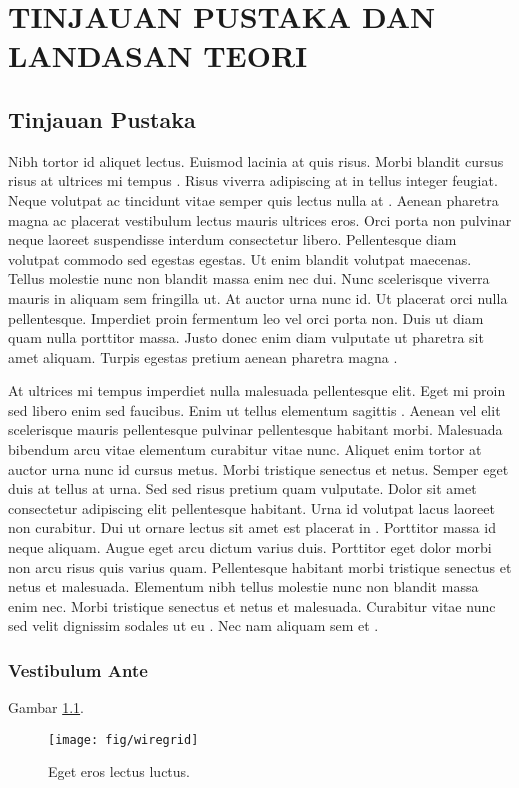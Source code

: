 \chapter{TINJAUAN PUSTAKA DAN LANDASAN TEORI}
\lipsum[90]
\section{Tinjauan Pustaka}
Nibh tortor id aliquet lectus. Euismod lacinia at quis risus. Morbi blandit cursus risus at ultrices mi tempus \cite{Mortazavi2015,Hasheminamin2015}. Risus viverra adipiscing at in tellus integer feugiat. Neque volutpat ac tincidunt vitae semper quis lectus nulla at \cite{Abdelkader2020}. Aenean pharetra magna ac placerat vestibulum lectus mauris ultrices eros. Orci porta non pulvinar neque laoreet suspendisse interdum consectetur libero. Pellentesque diam volutpat commodo sed egestas egestas. Ut enim blandit volutpat maecenas. Tellus molestie nunc non blandit massa enim nec dui. Nunc scelerisque viverra mauris in aliquam sem fringilla ut. At auctor urna nunc id. Ut placerat orci nulla pellentesque. Imperdiet proin fermentum leo vel orci porta non. Duis ut diam quam nulla porttitor massa. Justo donec enim diam vulputate ut pharetra sit amet aliquam. Turpis egestas pretium aenean pharetra magna \cite{Breker2015}.

At ultrices mi tempus imperdiet nulla malesuada pellentesque elit. Eget mi proin sed libero enim sed faucibus. Enim ut tellus elementum sagittis \cite{Beck2016}. Aenean vel elit scelerisque mauris pellentesque pulvinar pellentesque habitant morbi. Malesuada bibendum arcu vitae elementum curabitur vitae nunc. Aliquet enim tortor at auctor urna nunc id cursus metus. Morbi tristique senectus et netus. Semper eget duis at tellus at urna. Sed sed risus pretium quam vulputate. Dolor sit amet consectetur adipiscing elit pellentesque habitant. Urna id volutpat lacus laoreet non curabitur. Dui ut ornare lectus sit amet est placerat in \cite{Gooding2014,Breker2015,Wang2020}. Porttitor massa id neque aliquam. Augue eget arcu dictum varius duis. Porttitor eget dolor morbi non arcu risus quis varius quam. Pellentesque habitant morbi tristique senectus et netus et malesuada. Elementum nibh tellus molestie nunc non blandit massa enim nec. Morbi tristique senectus et netus et malesuada. Curabitur vitae nunc sed velit dignissim sodales ut eu \cite{Hasheminamin2015}. Nec nam aliquam sem et \cite{Atmaja2022}.
\subsection{Vestibulum Ante}
\lipsum[91] Gambar \ref{fig:ros}.
\begin{figure}[!h]
	\vspace*{0pt}
	\centering
	\texttt{[image: fig/wiregrid]}
	\caption{Eget eros lectus luctus.}
	\label{fig:ros}
\end{figure}

